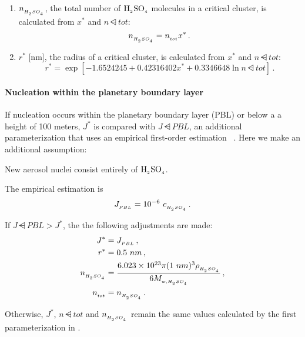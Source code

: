\begin{enumerate}
        .
  \item $n_{_{H_{_2}SO_{_4}}}$, the total number of $\rm H_{_2}SO_{_4}$ molecules in a critical
        cluster, is calculated from $x^*$ and $n\dsub{tot}$:
        \begin{equation}
          n_{_{H_{_2}SO_{_4}}} = n_{_{tot}} x^* \,.
        \end{equation}
  \item $r^*$ [nm], the radius of a critical cluster, is calculated from
        $x^*$ and $n\dsub{tot}$:
        \begin{equation}
          r^* = \exp \left[ -1.6524245 + 0.42316402 x^* +
                0.3346648 \ln n\dsub{tot} \right] \,.
        \end{equation}
\end{enumerate}

\paragraph{Nucleation within the planetary boundary layer} 

If nucleation occurs within the planetary boundary layer (PBL) or below a
a height of 100 meters, $J^*$ is compared with $J\dsub{PBL}$, an additional
parameterization that uses an empirical first-order estimation
~\cite{sihto-2006-acp,wang-2009-acp}. Here we make an additional assumption:

\begin{assume}
  New aerosol nuclei consist entirely of $\rm H_{_2}SO_{_4}$.
\end{assume}

The empirical estimation is
\begin{equation}
  J_{_{PBL}} = 10^{-6}~c_{_{H_{_2}SO_{_4}}} \,.
\end{equation}

If $J\dsub{PBL} > J^*$, the the following adjustments are made:
\begin{align}
  J^* &= J_{_{PBL}} \,, \\
  r^* &= 0.5~nm \,, \\
  n_{_{H_{_2}SO_{_4}}} &= \frac{6.023 \times 10^{23} \pi (1~nm)^3
                  \rho_{_{H_{_2}SO_{_4}}}}{6 M_{_{w,H_{_2}SO_{_4}}}} \,, \\
  n_{_{tot}} &= n_{_{H_{_2}SO_{_4}}} \,.
\end{align}

Otherwise, $J^*$, $n\dsub{tot}$ and $n_{_{H_{_2}SO_{_4}}}$ remain the same values
calculated by the first parameterization in .

